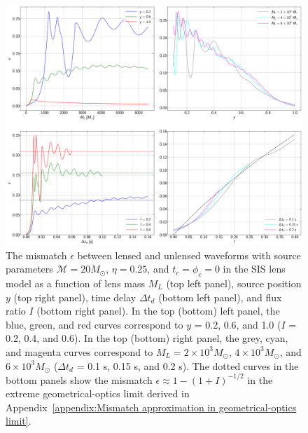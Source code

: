 \documentclass[floats,floatfix,showpacs,amssymb,prd,twocolumn,superscriptaddress,nofootinbib,nolongbibliography,reprint]{revtex4-2}
\begin{document}
\begin{figure}
    \centering
    \includegraphics[scale = 0.28]{Figures/1D_plot_mismatch_combo.pdf}
    \caption{
    The mismatch $\epsilon$ between lensed and unlensed waveforms with source parameters $\mathcal{M} = 20 M_\odot$, $\eta = 0.25$, and $t_c = \phi_c = 0$ in the SIS lens model as a function of lens mass $M_L$ (top left panel), source position $y$ (top right panel), time delay $\Delta t_d$ (bottom left panel), and flux ratio $I$ (bottom right panel). In the top (bottom) left panel, the blue, green, and red curves correspond to $y$ = 0.2, 0.6, and 1.0 ($I$ = 0.2, 0.4, and 0.6).  In the top (bottom) right panel, the grey, cyan, and magenta curves correspond to $M_L = 2 \times 10^3 M_\odot$, $4 \times 10^3 M_\odot$, and $6 \times 10^3 M_\odot$ ($\Delta t_d$ = 0.1 s, 0.15 s, and 0.2 s).  The dotted curves in the bottom panels show the mismatch $\epsilon \approx 1 - (1 + I)^{-1/2}$ in the extreme geometrical-optics limit derived in Appendix~\ref{appendix:Mismatch approximation in geometrical-optics limit}.
    }
    \label{fig:1d mismatch y-ML}    
\end{figure}
\end{document}
